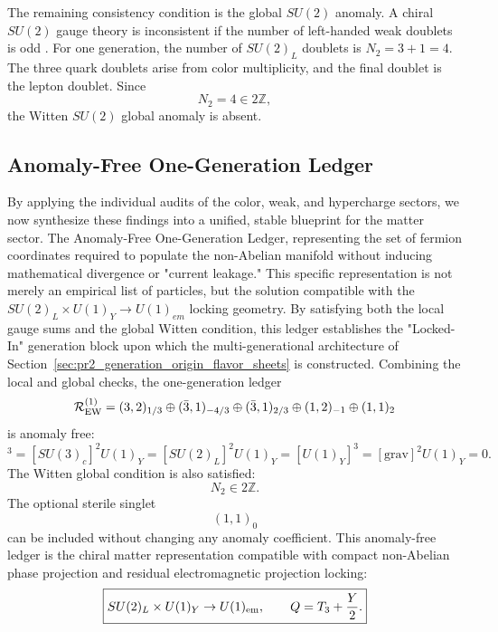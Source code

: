 \documentclass[11pt]{article}
\begin{document}
\label{sec:pr2_witten_global_anomaly}

The remaining consistency condition is the global \(SU(2)\) anomaly. 
A chiral \(SU(2)\) gauge theory is inconsistent if the number of left-handed weak doublets is odd \cite{Witten1982}. 
For one generation, the number of \(SU(2)_L\) doublets is $N_2=3+1=4$. The three quark doublets arise from color multiplicity, and the final doublet is the lepton doublet. 
Since
\begin{equation}
\boxed{
N_2=4\in2\mathbb Z,
}
\end{equation}
the Witten \(SU(2)\) global anomaly is absent.

\subsection{Anomaly-Free One-Generation Ledger}
\label{sec:pr2_anomaly_free_one_generation_ledger}
By applying the individual audits of the color, weak, and hypercharge sectors, we now synthesize these findings into a unified, stable blueprint for the matter sector. The Anomaly-Free One-Generation Ledger, representing the set of fermion coordinates required to populate the non-Abelian manifold without inducing mathematical divergence or "current leakage." This specific representation is not merely an empirical list of particles, but the solution compatible with the $SU(2)_L \times U(1)_Y \to U(1)_{em}$ locking geometry. By satisfying both the local gauge sums and the global Witten condition, this ledger establishes the "Locked-In" generation block upon which the multi-generational architecture of Section~\ref{sec:pr2_generation_origin_flavor_sheets} is constructed. Combining the local and global checks, the one-generation ledger
\begin{equation}
\mathcal R_{\rm EW}^{(1)}
=
(3,2)_{1/3}
\oplus
(\bar3,1)_{-4/3}
\oplus
(\bar3,1)_{2/3}
\oplus
(1,2)_{-1}
\oplus
(1,1)_2
\end{equation}
is anomaly free:
\begin{equation}
[SU(3)_c]^3
=
[SU(3)_c]^2U(1)_Y
=
[SU(2)_L]^2U(1)_Y
=
[U(1)_Y]^3
=
[\mathrm{grav}]^2U(1)_Y
=
0.
\end{equation}
The Witten global condition is also satisfied:
\begin{equation}
N_2\in2\mathbb Z.
\end{equation}
The optional sterile singlet
\begin{equation}
(1,1)_0
\end{equation}
can be included without changing any anomaly coefficient. This anomaly-free ledger is the chiral matter representation compatible with compact non-Abelian phase projection and residual electromagnetic projection locking:
\begin{equation}
\boxed{
SU(2)_L\times U(1)_Y
\rightarrow
U(1)_{\rm em},
\qquad
Q=T_3+\frac{Y}{2}.
}
\end{equation}
\end{document}
